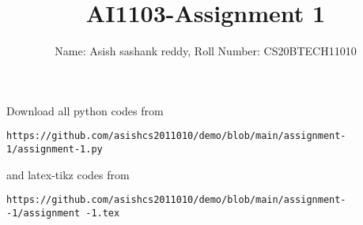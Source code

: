 \documentclass[journal,12pt,twocolumn]{IEEEtran}
\DeclareMathOperator*{\Res}{Res}
\begin{document}
\newcommand{\BEQA}{\begin{eqnarray}}
\newcommand{\EEQA}{\end{eqnarray}}
\newcommand{\define}{\stackrel{\triangle}{=}}

\raggedbottom
\setlength{\parindent}{0pt}
\providecommand{\mbf}{\mathbf}
\providecommand{\pr}[1]{\ensuremath{\Pr\left(#1\right)}}
\providecommand{\qfunc}[1]{\ensuremath{Q\left(#1\right)}}
\providecommand{\sbrak}[1]{\ensuremath{{}\left[#1\right]}}
\providecommand{\lsbrak}[1]{\ensuremath{{}\left[#1\right.}}
\providecommand{\rsbrak}[1]{\ensuremath{{}\left.#1\right]}}
\providecommand{\brak}[1]{\ensuremath{\left(#1\right)}}
\providecommand{\lbrak}[1]{\ensuremath{\left(#1\right.}}
\providecommand{\rbrak}[1]{\ensuremath{\left.#1\right)}}
\providecommand{\cbrak}[1]{\ensuremath{\left\{#1\right\}}}
\providecommand{\lcbrak}[1]{\ensuremath{\left\{#1\right.}}
\providecommand{\rcbrak}[1]{\ensuremath{\left.#1\right\}}}
\theoremstyle{remark}
\newtheorem{rem}{Remark}
\newcommand{\sgn}{\mathop{\mathrm{sgn}}}
\providecommand{\abs}[1]{\vert#1\vert}
\providecommand{\res}[1]{\Res\displaylimits_{#1}} 
\providecommand{\norm}[1]{\lVert#1\rVert}
\providecommand{\mtx}[1]{\mathbf{#1}}
\providecommand{\mean}[1]{E[ #1 ]}
\providecommand{\fourier}{\overset{\mathcal{F}}{ \rightleftharpoons}}
\providecommand{\system}{\overset{\mathcal{H}}{ \longleftrightarrow}}
\newcommand{\solution}{\noindent \textbf{Solution: }}
\newcommand{\cosec}{\,\text{cosec}\,}
\providecommand{\dec}[2]{\ensuremath{\overset{#1}{\underset{#2}{\gtrless}}}}
\newcommand{\myvec}[1]{\ensuremath{\begin{pmatrix}#1\end{pmatrix}}}
\newcommand{\mydet}[1]{\ensuremath{\begin{vmatrix}#1\end{vmatrix}}}
\makeatletter
{}
\makeatother
\let\StandardTheFigure\thefigure
\let\vec\mathbf
\renewcommand{\thefigure}{\theproblem}
\def\putbox#1#2#3{\makebox[0in][l]{\makebox[#1][l]{}\raisebox{\baselineskip}[0in][0in]{\raisebox{#2}[0in][0in]{#3}}}}
     \def\rightbox#1{\makebox[0in][r]{#1}}
     \def\centbox#1{\makebox[0in]{#1}}
     \def\topbox#1{\raisebox{-\baselineskip}[0in][0in]{#1}}
     \def\midbox#1{\raisebox{-0.5\baselineskip}[0in][0in]{#1}}
\vspace{3cm}
\title{AI1103-Assignment 1}
\author{Name: Asish sashank reddy, Roll Number: CS20BTECH11010}
\maketitle
\newpage
\bigskip
\renewcommand{\thefigure}{\theenumi}
\renewcommand{\thetable}{\theenumi}
Download all python codes from 
\begin{lstlisting}
https://github.com/asishcs2011010/demo/blob/main/assignment-1/assignment-1.py
\end{lstlisting}
%
and latex-tikz codes from 
%
\begin{lstlisting}
https://github.com/asishcs2011010/demo/blob/main/assignment--1/assignment -1.tex
\end{lstlisting}
\end{document}
